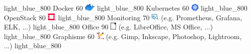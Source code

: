 \documentclass[
  paper=a4,
  fontsize=10pt
]{resume}
\begin{document}
{        {}%
        {light_blue_800}
      \skill%
        {Docker}%
        {60}%
        {\includegraphics[height=1em]{skill/docker.png}}%
        {}%
        {light_blue_800}
      \skill%
        {Kubernetes}%
        {60}%
        {\includegraphics[height=1em]{skill/kubernetes.png}}%
        {}%
        {light_blue_800}
      \skill%
        {OpenStack}%
        {80}%
        {\includegraphics[height=1em]{skill/openstack.png}}%
        {}%
        {light_blue_800}
      \skill%
        {Monitoring}%
        {70}%
        {\includegraphics[height=1em]{skill/monitoring2.png}}%
        {(e.g. Prometheus, Grafana, ELK, ...)}%
        {light_blue_800}
      \skill%
        {Office}%
        {90}%
        {\includegraphics[height=1em]{skill/office.png}}%
        {(e.g. LibreOffice, MS Office, ...)}%
        {light_blue_800}
      \skill%
        {Graphisme}%
        {60}%
        {\includegraphics[height=1em]{skill/graphism.png}}%
        {(e.g. Gimp, Inkscape, Photoshop, Lightroom, ...)}%
        {light_blue_800}
}
\end{document}
